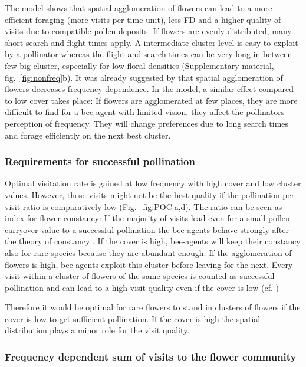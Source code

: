 The model shows that spatial agglomeration of flowers can lead to a more efficient foraging (more visits per time unit), less FD and a higher quality of visits due to compatible pollen deposits. If flowers are evenly distributed, many short search and flight times apply. A intermediate cluster level is easy to exploit by a pollinator whereas the flight and search times can be very long in between few big cluster, especially for low floral densities (Supplementary material, fig.~\ref{fig:nonfreq}b). 
It was already suggested by \cite{epperson1987frequency} that spatial agglomeration of flowers decreases frequency dependence. In the model, a similar effect compared to low cover takes place: If flowers are agglomerated at few places, they are more difficult to find for a bee-agent with limited vision, they affect the pollinators perception of frequency. They will change preferences due to long search times and forage efficiently on the next best cluster. 


\subsubsection*{Requirements for successful pollination}
Optimal visitation rate is gained at low frequency with high cover and low cluster values. However, those visits might not be the best quality if the pollination per visit ratio is comparatively low (Fig.~\ref{fig:POC}a,d). 
The ratio can be seen as index for flower constancy: If the majority of visits lead even for a small pollen-carryover value to a successful pollination the bee-agents behave strongly after the theory of constancy \citep{montgomery2009pollen}. If the cover is high, bee-agents will keep their constancy also for rare species because they are abundant enough. If the agglomeration of flowers is high, bee-agents exploit this cluster before leaving for the next. Every visit within a cluster of flowers of the same species is counted as successful pollination and can lead to a high visit quality even if the cover is low (cf. \citealt{jakobsson2009relationships})

Therefore it would be optimal for rare flowers to stand in clusters of flowers if the cover is low to get sufficient pollination. If the cover is high the spatial distribution plays a minor role for the visit quality.  

\subsubsection*{Frequency dependent sum of visits to the flower community}


